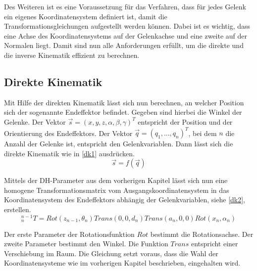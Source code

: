 Des Weiteren ist es eine Voraussetzung für das Verfahren, dass für jedes Gelenk ein eigenes Koordinatensystem definiert ist, damit die Transformationsgleichungen aufgestellt werden können. Dabei ist es wichtig, dass eine Achse des Koordinatensystems auf der Gelenkachse und eine zweite auf der Normalen liegt. Damit sind nun alle Anforderungen erfüllt, um die direkte und die inverse Kinematik effizient zu berechnen.

\subsection{Direkte Kinematik}

Mit Hilfe der direkten Kinematik lässt sich nun berechnen, an welcher Position sich der sogenannte Endeffektor befindet. Gegeben sind hierbei die Winkel der Gelenke. Der Vektor $ \vec{s} = (x,y,z,\alpha,\beta,\gamma)^T $  entspricht der Position und der Orientierung des Endeffektors. Der Vektor $ \vec{q} = (q_1, ...,q_n)^T $, bei dem $n$ die Anzahl der Gelenke ist, entspricht den Gelenkvariablen. Dann lässt sich die direkte Kinematik wie in \autoref{dk1} ausdrücken.
\begin{equation}
  \vec{s} = f(\vec{q})
\label{dk1}
\end{equation}

Mittels der DH-Parameter aus dem vorherigen Kapitel lässt sich nun eine homogene Transformationsmatrix vom Ausgangskoordinatensystem in das Koordinatensystem des Endeffektors abhängig der Gelenkvariablen, siehe \autoref{dk2}, erstellen.
\begin{equation}
  ^{n-1}_{n}T = Rot(z_{n-1},\theta_n)Trans(0,0,d_{n})Trans(a_{n},0,0)Rot(x_{n},\alpha_{n})
\label{dk2}
\end{equation}

Der erste Parameter der Rotationsfunktion $Rot$ bestimmt die Rotationsachse. Der zweite Parameter bestimmt den Winkel. Die Funktion $Trans$ entspricht einer Verschiebung im Raum. Die Gleichung setzt voraus, dass die Wahl der Koordinatensysteme wie im vorherigen Kapitel beschrieben, eingehalten wird.

